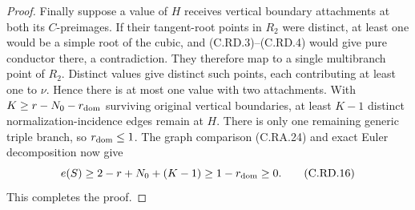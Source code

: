\begin{proof}
Finally suppose a value of $H$ receives vertical
boundary attachments at both its $C$-preimages.
If their tangent-root points in $R_2$ were distinct,
at least one would be a simple root of the cubic,
and (C.RD.3)--(C.RD.4) would give pure conductor
there, a contradiction. They therefore map to a
single multibranch point of $R_2$. Distinct values
give distinct such points, each contributing at
least one to $\nu$. Hence there is at most one
value with two attachments. With
$K\ge r-N_0-r_{\rm dom}$ surviving original
vertical boundaries, at least $K-1$ distinct
normalization-incidence edges remain at $H$.
There is only one remaining generic triple branch,
so $r_{\rm dom}\le1$. The graph comparison
(C.RA.24) and exact Euler decomposition now give
\[
 e(S)\ge2-r+N_0+(K-1)
                         \ge1-r_{\rm dom}\ge0.
\tag{C.RD.16}
\]
This completes the proof.
\end{proof}

